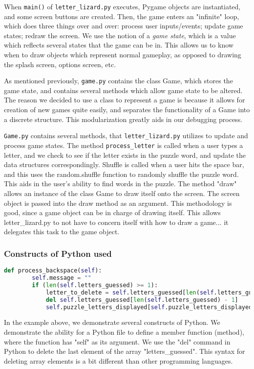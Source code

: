 	When \texttt{main()} of \texttt{letter\_lizard.py} executes, Pygame objects are instantiated, and some screen buttons are created. Then, the game enters an "infinite" loop, which does three things over and over: process user inputs/events; update game states; redraw the screen. We use the notion of a \emph{game state}, which is a value which reflects several states that the game can be in. This allows us to know when to draw objects which represent normal gameplay, as opposed to drawing the splash screen, options screen, etc.
	
	As mentioned previously, \texttt{game.py} contains the class Game, which stores the game state, and contains several methods which allow game state to be altered. The reason we decided to use a class to represent a game is because it allows for creation of new games quite easily, and separates the functionality of a Game into a discrete structure. This modularization greatly aids in our debugging process.
	
	\texttt{Game.py} contains several methods, that \texttt{letter\_lizard.py} utilizes to update and process game states. The method \texttt{process\_letter} is called when a user types a letter, and we check to see if the letter exists in the puzzle word, and update the data structures correspondingly. Shuffle is called when a user hits the space bar, and this uses the random.shuffle function to randomly shuffle the puzzle word. This aids in the user's ability to find words in the puzzle. The method "draw" allows an instance of the class Game to draw itself onto the screen. The screen object is passed into the draw method as an argument. This methodology is good, since a game object can be in charge of drawing itself. This allows letter\_lizard.py to not have to concern itself with how to draw a game... it delegates this task to the game object.
	
	
\subsubsection{Constructs of Python used}

\begin{minipage}[t]{1\linewidth}
\begin{lstlisting}[language=Python, %
  title={}, label=bash1]
    def process_backspace(self):
        self.message = ""
        if (len(self.letters_guessed) >= 1):
            letter_to_delete = self.letters_guessed[len(self.letters_guessed) - 1]
            del self.letters_guessed[len(self.letters_guessed) - 1]
            self.puzzle_letters_displayed[self.puzzle_letters_displayed.index('')] = letter_to_delete
\end{lstlisting}
\end{minipage}
In the example above, we demonstrate several constructs of Python. We demonstrate the ability for a Python file to define a member function (method), where the function has "self" as its argument. We use the "del" command in Python to delete the last element of the array "letters\_guessed". This syntax for deleting array elements is a bit different than other programming languages.

